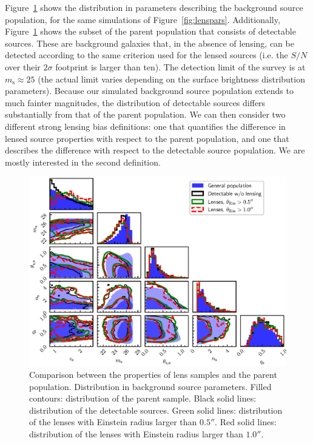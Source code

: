\documentclass{aa}
\def\msource{m_{\mathrm{s}}}
\def\Fref#1{Figure~\ref{#1}\xspace}
\begin{document}
\Fref{fig:sourcepars} shows the distribution in parameters describing the background source population, for the same simulations of \Fref{fig:lenspars}. 
Additionally, \Fref{fig:sourcepars} shows the subset of the parent population that consists of detectable sources.
These are background galaxies that, in the absence of lensing, can be detected according to the same criterion used for the lensed sources (i.e. the $S/N$ over their $2\sigma$ footprint is larger than ten).
The detection limit of the survey is at $\msource\approx25$ (the actual limit varies depending on the surface brightness distribution parameters).
Because our simulated background source population extends to much fainter magnitudes, the distribution of detectable sources differs substantially from that of the parent population.
We can then consider two different strong lensing bias definitions: one that quantifies the difference in lensed source properties with respect to the parent population, and one that describes the difference with respect to the detectable source population. We are mostly interested in the second definition.

\begin{figure}
\includegraphics[width=\textwidth]{source_cornerplot.eps}
\caption{
Comparison between the properties of lens samples and the parent population. Distribution in background source parameters.
Filled contours: distribution of the parent sample.
Black solid lines: distribution of the detectable sources.
Green solid lines: distribution of the lenses with Einstein radius larger than $0.5''$.
Red solid lines: distribution of the lenses with Einstein radius larger than $1.0''$.
\label{fig:sourcepars}
}
\end{figure}
\end{document}
